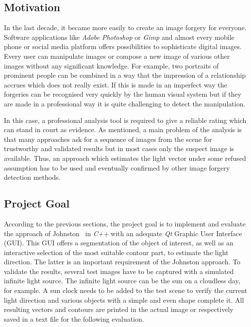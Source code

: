 \subsection{Motivation}\label{sec:Motivation}
In the last decade, it became more easily to create an image forgery for everyone. Software applications like \textit{Adobe Photoshop} or \textit{Gimp} and almost every mobile phone or social media platform offers possibilities to sophisticate digital images. Every user can manipulate images or compose a new image of various other images without any significant knowledge. For example, two portraits of prominent people can be combined in a way that the impression of a relationship accrues which does not really exist. If this is made in an imperfect way the forgeries can be recognised very quickly by the human visual system but if they are made in a professional way it is quite challenging to detect the manipulation. 

In this case, a professional analysis tool is required to give a reliable rating which can stand in court as evidence. As mentioned, a main problem of the analysis is that many approaches ask for a sequence of images from the scene for trustworthy and validated results but in most cases only the suspect image is available. Thus, an approach which estimates the light vector under some refused assumption has to be used and eventually confirmed by other image forgery detection methods. 

\subsection{Project Goal}\label{sec:Project Goal}
According to the previous sections, the project goal is to implement and evaluate the approach of Johnston~\cite{Johnson} in \textit{C++} with an adequate \textit{Qt} Graphic User Interface (GUI). This GUI offers a segmentation of the object of interest, as well as an interactive selection of the most suitable contour part, to estimate the light direction. The latter is an important requirement of the Johnston approach. To validate the results, several test images have to be captured with a simulated infinite light source. The infinite light source can be the sun on a cloudless day, for example. A sun clock needs to be added to the test scene to verify the current light direction and various objects with a simple and even shape complete it. All resulting vectors and contours are printed in the actual image or respectively saved in a text file for the following evaluation.



\newpage


















